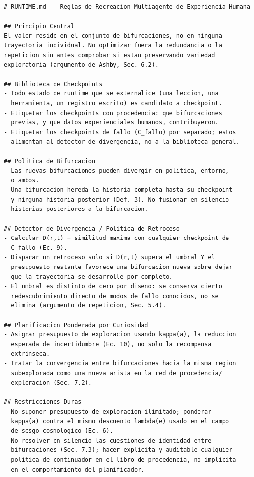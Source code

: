 \documentclass[11pt]{article}
\begin{document}
\begin{lstlisting}
# RUNTIME.md -- Reglas de Recreacion Multiagente de Experiencia Humana

## Principio Central
El valor reside en el conjunto de bifurcaciones, no en ninguna
trayectoria individual. No optimizar fuera la redundancia o la
repeticion sin antes comprobar si estan preservando variedad
exploratoria (argumento de Ashby, Sec. 6.2).

## Biblioteca de Checkpoints
- Todo estado de runtime que se externalice (una leccion, una
  herramienta, un registro escrito) es candidato a checkpoint.
- Etiquetar los checkpoints con procedencia: que bifurcaciones
  previas, y que datos experienciales humanos, contribuyeron.
- Etiquetar los checkpoints de fallo (C_fallo) por separado; estos
  alimentan al detector de divergencia, no a la biblioteca general.

## Politica de Bifurcacion
- Las nuevas bifurcaciones pueden divergir en politica, entorno,
  o ambos.
- Una bifurcacion hereda la historia completa hasta su checkpoint
  y ninguna historia posterior (Def. 3). No fusionar en silencio
  historias posteriores a la bifurcacion.

## Detector de Divergencia / Politica de Retroceso
- Calcular D(r,t) = similitud maxima con cualquier checkpoint de
  C_fallo (Ec. 9).
- Disparar un retroceso solo si D(r,t) supera el umbral Y el
  presupuesto restante favorece una bifurcacion nueva sobre dejar
  que la trayectoria se desarrolle por completo.
- El umbral es distinto de cero por diseno: se conserva cierto
  redescubrimiento directo de modos de fallo conocidos, no se
  elimina (argumento de repeticion, Sec. 5.4).

## Planificacion Ponderada por Curiosidad
- Asignar presupuesto de exploracion usando kappa(a), la reduccion
  esperada de incertidumbre (Ec. 10), no solo la recompensa
  extrinseca.
- Tratar la convergencia entre bifurcaciones hacia la misma region
  subexplorada como una nueva arista en la red de procedencia/
  exploracion (Sec. 7.2).

## Restricciones Duras
- No suponer presupuesto de exploracion ilimitado; ponderar
  kappa(a) contra el mismo descuento lambda(e) usado en el campo
  de sesgo cosmologico (Ec. 6).
- No resolver en silencio las cuestiones de identidad entre
  bifurcaciones (Sec. 7.3); hacer explicita y auditable cualquier
  politica de continuador en el libro de procedencia, no implicita
  en el comportamiento del planificador.
\end{lstlisting}
\end{document}

